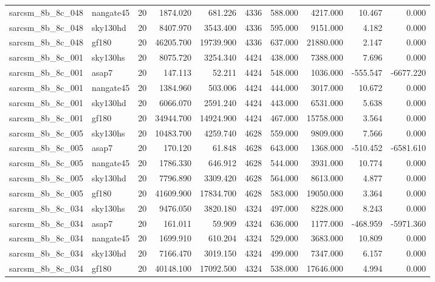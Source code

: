 \documentclass{article}
\begin{document}
\begin{longtable}{llrrrrrrrr}
sarcsm\_8b\_8c\_048 & nangate45 & 20 & 1874.020 & 681.226 & 4336 & 588.000 & 4217.000 & 10.467 & 0.000 \\
sarcsm\_8b\_8c\_048 & sky130hd & 20 & 8407.970 & 3543.400 & 4336 & 595.000 & 9151.000 & 4.182 & 0.000 \\
sarcsm\_8b\_8c\_048 & gf180 & 20 & 46205.700 & 19739.900 & 4336 & 637.000 & 21880.000 & 2.147 & 0.000 \\
sarcsm\_8b\_8c\_001 & sky130hs & 20 & 8075.720 & 3254.340 & 4424 & 438.000 & 7388.000 & 7.696 & 0.000 \\
sarcsm\_8b\_8c\_001 & asap7 & 20 & 147.113 & 52.211 & 4424 & 548.000 & 1036.000 & -555.547 & -6677.220 \\
sarcsm\_8b\_8c\_001 & nangate45 & 20 & 1384.960 & 503.006 & 4424 & 444.000 & 3017.000 & 10.672 & 0.000 \\
sarcsm\_8b\_8c\_001 & sky130hd & 20 & 6066.070 & 2591.240 & 4424 & 443.000 & 6531.000 & 5.638 & 0.000 \\
sarcsm\_8b\_8c\_001 & gf180 & 20 & 34944.700 & 14924.900 & 4424 & 467.000 & 15758.000 & 3.564 & 0.000 \\
sarcsm\_8b\_8c\_005 & sky130hs & 20 & 10483.700 & 4259.740 & 4628 & 559.000 & 9809.000 & 7.566 & 0.000 \\
sarcsm\_8b\_8c\_005 & asap7 & 20 & 170.120 & 61.848 & 4628 & 643.000 & 1368.000 & -510.452 & -6581.610 \\
sarcsm\_8b\_8c\_005 & nangate45 & 20 & 1786.330 & 646.912 & 4628 & 544.000 & 3931.000 & 10.774 & 0.000 \\
sarcsm\_8b\_8c\_005 & sky130hd & 20 & 7796.890 & 3309.420 & 4628 & 564.000 & 8613.000 & 4.877 & 0.000 \\
sarcsm\_8b\_8c\_005 & gf180 & 20 & 41609.900 & 17834.700 & 4628 & 583.000 & 19050.000 & 3.364 & 0.000 \\
sarcsm\_8b\_8c\_034 & sky130hs & 20 & 9476.050 & 3820.180 & 4324 & 497.000 & 8228.000 & 8.243 & 0.000 \\
sarcsm\_8b\_8c\_034 & asap7 & 20 & 161.011 & 59.909 & 4324 & 636.000 & 1177.000 & -468.959 & -5971.360 \\
sarcsm\_8b\_8c\_034 & nangate45 & 20 & 1699.910 & 610.204 & 4324 & 529.000 & 3683.000 & 10.809 & 0.000 \\
sarcsm\_8b\_8c\_034 & sky130hd & 20 & 7166.470 & 3019.150 & 4324 & 499.000 & 7347.000 & 6.157 & 0.000 \\
sarcsm\_8b\_8c\_034 & gf180 & 20 & 40148.100 & 17092.500 & 4324 & 538.000 & 17646.000 & 4.994 & 0.000 \\

\end{longtable}
\end{document}
